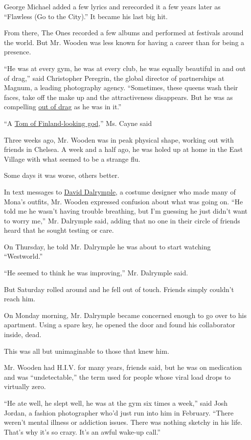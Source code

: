 George Michael added a few lyrics and rerecorded it a few years later as
``Flawless (Go to the City).'' It became his last big hit.

From there, The Ones recorded a few albums and performed at festivals
around the world. But Mr. Wooden was less known for having a career than
for being a presence.

``He was at every gym, he was at every club, he was equally beautiful in
and out of drag,'' said Christopher Peregrin, the global director of
partnerships at Magnum, a leading photography agency. ``Sometimes, these
queens wash their faces, take off the make up and the attractiveness
disappears. But he was as compelling
\href{https://www.instagram.com/p/B-FmVdbhEqn/}{out of drag} as he was
in it.''

``A \href{https://www.instagram.com/p/B-HAIqPC-PN/}{Tom of
Finland-looking god},'' Ms. Cayne said

Three weeks ago, Mr. Wooden was in peak physical shape, working out with
friends in Chelsea. A week and a half ago, he was holed up at home in
the East Village with what seemed to be a strange flu.

Some days it was worse, others better.

In text messages to
\href{https://www.instagram.com/daviddalrympleinc/?hl=en}{David
Dalrymple}, a costume designer who made many of Mona's outfits, Mr.
Wooden expressed confusion about what was going on. ``He told me he
wasn't having trouble breathing, but I'm guessing he just didn't want to
worry me,'' Mr. Dalrymple said, adding that no one in their circle of
friends heard that he sought testing or care.

On Thursday, he told Mr. Dalrymple he was about to start watching
``Westworld.''

``He seemed to think he was improving,'' Mr. Dalrymple said.

But Saturday rolled around and he fell out of touch. Friends simply
couldn't reach him.

On Monday morning, Mr. Dalrymple became concerned enough to go over to
his apartment. Using a spare key, he opened the door and found his
collaborator inside, dead.

This was all but unimaginable to those that knew him.

Mr. Wooden had H.I.V. for many years, friends said, but he was on
medication and was ``undetectable,'' the term used for people whose
viral load drops to virtually zero.

``He ate well, he slept well, he was at the gym six times a week,'' said
Josh Jordan, a fashion photographer who'd just run into him in February.
``There weren't mental illness or addiction issues. There was nothing
sketchy in his life. That's why it's so crazy. It's an awful wake-up
call.''

